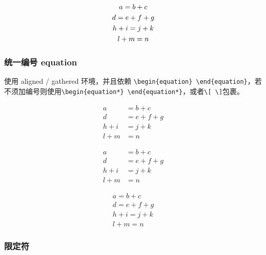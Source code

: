 \documentclass[utf-8,a4paper,11pt]{article}
\begin{document}
\begin{LTXexample}
  \begin{gather} 
    a = b + c \\ 
    d = e + f + g \\ 
    h + i = j + k \notag \\ 
    l + m = n 
  \end{gather}
\end{LTXexample}

\subsubsection{统一编号 equation}

使用 aligned / gathered 环境，并且依赖 \verb!\begin{equation} \end{equation}!，若不须加编号则使用\verb!\begin{equation*} \end{equation*}!，或者\verb!\[ \]!包裹。

\begin{LTXexample}
\begin{equation}
  \begin{aligned} 
      a &= b + c \\
      d &= e + f + g \\
      h + i &= j + k \\
      l + m &= n
  \end{aligned}
\end{equation}

\begin{equation*}
  \begin{aligned} 
      a &= b + c \\
      d &= e + f + g \\
      h + i &= j + k \\
      l + m &= n
  \end{aligned}
\end{equation*}

\[
  \begin{gathered}
      a = b + c \\
      d = e + f + g \\
      h + i = j + k \\
      l + m = n
  \end{gathered}
\]
\end{LTXexample}

\subsubsection{限定符}
\end{document}
